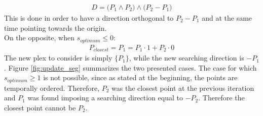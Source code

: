 \documentclass{article}
\begin{document}
\begin{itemize}
\begin{eqnarray}
D = \big ( P_1 \wedge P_2 \big ) \wedge \big ( P_2 - P_1 \big )
\end{eqnarray}
This is done in order to have a direction orthogonal to $P_2 - P_1$ and at the same time pointing towards the origin.
\\
On the opposite, when $s_{optimum} \leq 0$:
\begin{eqnarray}
P_{closest} = P_1 = P_1 \cdot 1 + P_2 \cdot 0
\label{eq:mix_seg_02}
\end{eqnarray}
The new plex to consider is simply $\lbrace P_1 \rbrace$, while the new searching direction is $-P_1$.
Figure \ref{fig:update_seg} summarizes the two presented cases.
The case for which $s_{optimum} \geq 1$ is not possible, since as stated at the beginning, the points are temporally ordered. Therefore, $P_2$ was the closest point at the previous iteration and $P_1$ was found imposing a searching direction equal to $-P_2$. Therefore the closest point cannot be $P_2$. 


\end{itemize}
\end{document}
